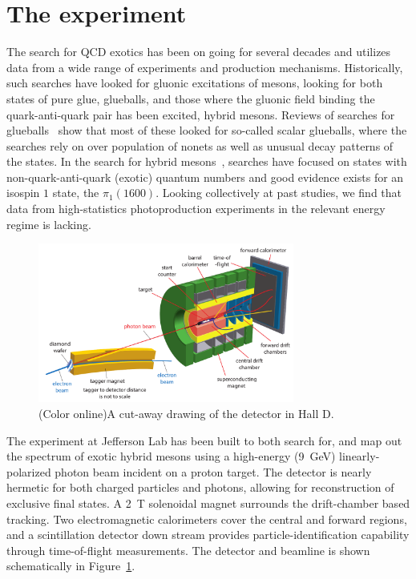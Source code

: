 \section[The \gx{} experiment (Curtis)]{\label{sec:gluexexperiment} The \gx{} experiment}
The search for QCD exotics has been on going for several decades and utilizes data from a wide range of experiments and production mechanisms. Historically, such searches have looked for gluonic excitations of mesons, looking for both states of pure glue, glueballs, and those where the gluonic field binding the quark-anti-quark pair has been excited, hybrid mesons. Reviews of searches for glueballs~\cite{Crede:2008vw} show that most of these looked for so-called scalar glueballs, where the searches rely on over population of nonets as well as unusual decay patterns of the states. In the search for hybrid mesons~\cite{Meyer:2010ku,Meyer:2015eta}, searches have focused on states with non-quark-anti-quark (exotic) quantum numbers and good evidence exists for an isospin $1$ state, the $\pi_{1}(1600)$. Looking collectively at past studies, we find that data from high-statistics photoproduction experiments in the relevant energy regime is lacking. 

\begin{figure}[h!]\centering
\includegraphics[width=0.75\textwidth]{figures/detector_beamline_noplug_noGlueX.pdf}
\caption[]{\label{fig:gluex_cut-away}(Color online)A cut-away drawing of the \GX{} detector in Hall D.}
\end{figure}
The \gx{} experiment at Jefferson Lab has been built to both search for, and map out the spectrum of exotic hybrid mesons using a high-energy (9~GeV) linearly-polarized photon beam incident on a proton target\cite{gluex-ref}. The detector is nearly hermetic for both charged particles and photons, allowing for reconstruction of exclusive final states. A 2~T solenoidal magnet surrounds the drift-chamber based tracking. Two electromagnetic calorimeters cover the central and forward regions, and a scintillation detector down stream provides particle-identification capability through time-of-flight measurements. The \gx{} detector and beamline is shown schematically in Figure~\ref{fig:gluex_cut-away}.


